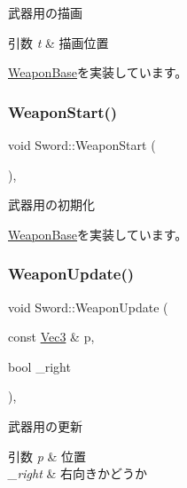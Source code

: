 武器用の描画 


\begin{DoxyParams}{引数}
{\em t} & 描画位置 \\
\hline
\end{DoxyParams}


\mbox{\hyperlink{class_weapon_base_af308d16d3892c3ffaeedf74b08e761b9}{Weapon\+Base}}を実装しています。

\mbox{\label{class_sword_af9027f627d1db6c0ac21d2aa842cff69}} 
\subsubsection{\texorpdfstring{Weapon\+Start()}{WeaponStart()}}
{\footnotesize\ttfamily void Sword\+::\+Weapon\+Start (\begin{DoxyParamCaption}{ }\end{DoxyParamCaption})\hspace{0.3cm}{\ttfamily [final]}, {\ttfamily [virtual]}}



武器用の初期化 



\mbox{\hyperlink{class_weapon_base_a25cd4c351638b76377e93341a9545712}{Weapon\+Base}}を実装しています。

\mbox{\label{class_sword_a5fda2f72829b6256ffc3fb18d9d065e8}} 
\subsubsection{\texorpdfstring{Weapon\+Update()}{WeaponUpdate()}}
{\footnotesize\ttfamily void Sword\+::\+Weapon\+Update (\begin{DoxyParamCaption}\item[{const \mbox{\hyperlink{common_8h_ab1cb35b3a17c398d8ef71d5f779808bf}{Vec3}} \&}]{p,  }\item[{bool}]{\+\_\+right }\end{DoxyParamCaption})\hspace{0.3cm}{\ttfamily [final]}, {\ttfamily [virtual]}}



武器用の更新 


\begin{DoxyParams}{引数}
{\em p} & 位置 \\
\hline
{\em \+\_\+right} & 右向きかどうか \\
\hline
\end{DoxyParams}


